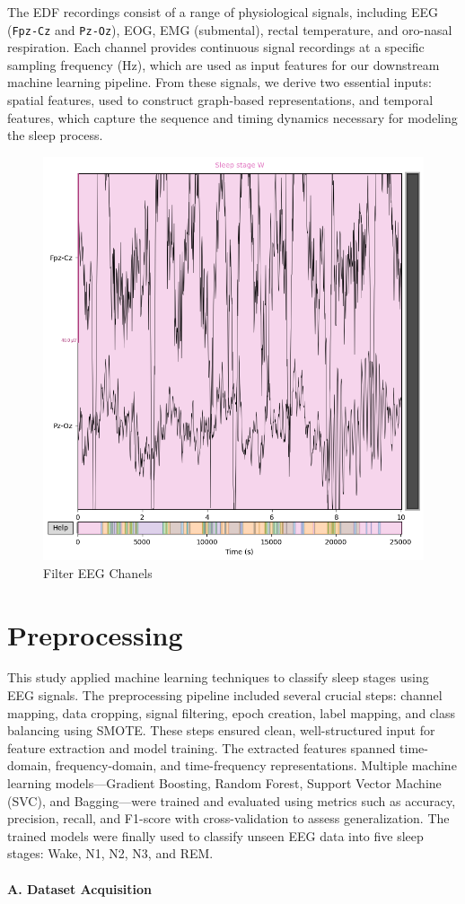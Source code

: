 The EDF recordings consist of a range of physiological signals, including EEG (\texttt{Fpz-Cz} and \texttt{Pz-Oz}), EOG, EMG (submental), rectal temperature, and oro-nasal respiration. Each channel provides continuous signal recordings at a specific sampling frequency (Hz), which are used as input features for our downstream machine learning pipeline. From these signals, we derive two essential inputs: spatial features, used to construct graph-based representations, and temporal features, which capture the sequence and timing dynamics necessary for modeling the sleep process.


\begin{figure}
	\centering
	\includegraphics[width=0.4\linewidth]{"./img/paper_1/EEG_Filter_chanel.png"}
	\caption{Filter EEG Chanels}
	\label{fig:eegfilterchanel}
\end{figure}


\section{Preprocessing}

This study applied machine learning techniques to classify sleep stages using EEG signals. The preprocessing pipeline included several crucial steps: channel mapping, data cropping, signal filtering, epoch creation, label mapping, and class balancing using SMOTE. These steps ensured clean, well-structured input for feature extraction and model training. The extracted features spanned time-domain, frequency-domain, and time-frequency representations. Multiple machine learning models—Gradient Boosting, Random Forest, Support Vector Machine (SVC), and Bagging—were trained and evaluated using metrics such as accuracy, precision, recall, and F1-score with cross-validation to assess generalization. The trained models were finally used to classify unseen EEG data into five sleep stages: Wake, N1, N2, N3, and REM.

\paragraph{A. Dataset Acquisition}

